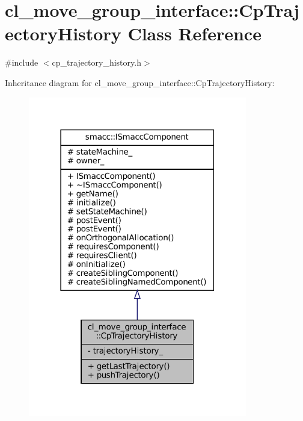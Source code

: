 \hypertarget{classcl__move__group__interface_1_1CpTrajectoryHistory}{}\section{cl\+\_\+move\+\_\+group\+\_\+interface\+:\+:Cp\+Trajectory\+History Class Reference}
\label{classcl__move__group__interface_1_1CpTrajectoryHistory}


{\ttfamily \#include $<$cp\+\_\+trajectory\+\_\+history.\+h$>$}



Inheritance diagram for cl\+\_\+move\+\_\+group\+\_\+interface\+:\+:Cp\+Trajectory\+History\+:
\nopagebreak
\begin{figure}[H]
\begin{center}
\leavevmode
\includegraphics[width=271pt]{classcl__move__group__interface_1_1CpTrajectoryHistory__inherit__graph}
\end{center}
\end{figure}


